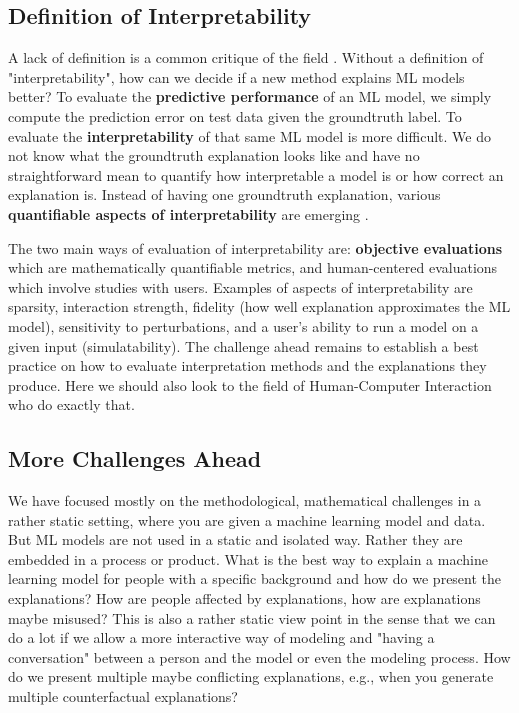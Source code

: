 \documentclass[runningheads]{llncs}
\begin{document}
\subsection{Definition of Interpretability}
A lack of definition is a common critique of the field \cite{lipton2018mythos,doshi2017towards}.
Without a definition of "interpretability", how can we decide if a new method explains ML models better?
To evaluate the \textbf{predictive performance} of an ML model, we simply compute the prediction error on test data given the groundtruth label.
To evaluate the \textbf{interpretability} of that same ML model is more difficult.
We do not know what the groundtruth explanation looks like and have no straightforward mean to quantify how interpretable a model is or how correct an explanation is.
Instead of having one groundtruth explanation, various \textbf{quantifiable aspects of interpretability} are emerging \cite{poursabzi2018manipulating,philipp2018measuring,molnar2019quantifying,hauenstein2018computing,zhou2018measuring,akaike1998information,schwarz1978estimating,poursabzi2018manipulating,dhurandhar2017tip,friedler2019assessing}.

The two main ways of evaluation of interpretability are: \textbf{objective evaluations} which are mathematically quantifiable metrics, and {human-centered evaluations} which involve studies with users.
Examples of aspects of interpretability are sparsity, interaction strength, fidelity (how well explanation approximates the ML model), sensitivity to perturbations, and a user's ability to run a model on a given input (simulatability).
The challenge ahead remains to establish a best practice on how to evaluate interpretation methods and the explanations they produce.
Here we should also look to the field of Human-Computer Interaction who do exactly that.

\subsection{More Challenges Ahead}
We have focused mostly on the methodological, mathematical challenges in a rather static setting, where you are given a machine learning model and data.
But ML models are not used in a static and isolated way.
Rather they are embedded in a process or product.
What is the best way to explain a machine learning model for people with a specific background and how do we present the explanations?
How are people affected by explanations, how are explanations maybe misused?
This is also a rather static view point in the sense that we can do a lot if we allow a more interactive way of modeling and "having a conversation" between a person and the model or even the modeling process.
How do we present multiple maybe conflicting explanations, e.g., when you generate multiple counterfactual explanations?
\end{document}
